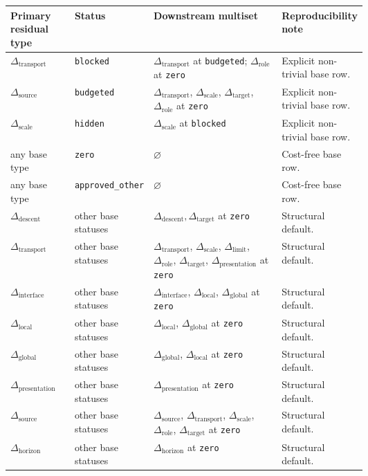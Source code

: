 \documentclass[11pt]{article}
\newcommand{\Ddescent}{\Delta_{\mathrm{descent}}}
\newcommand{\Dtransport}{\Delta_{\mathrm{transport}}}
\newcommand{\Dinterface}{\Delta_{\mathrm{interface}}}
\newcommand{\Dlocal}{\Delta_{\mathrm{local}}}
\newcommand{\Dglobal}{\Delta_{\mathrm{global}}}
\newcommand{\Dpresentation}{\Delta_{\mathrm{presentation}}}
\newcommand{\Dsource}{\Delta_{\mathrm{source}}}
\newcommand{\Dhorizon}{\Delta_{\mathrm{horizon}}}
\newcommand{\Dscale}{\Delta_{\mathrm{scale}}}
\newcommand{\Dlimit}{\Delta_{\mathrm{limit}}}
\newcommand{\Drole}{\Delta_{\mathrm{role}}}
\newcommand{\Dtarget}{\Delta_{\mathrm{target}}}
\theoremstyle{definition}
\begin{document}
\begin{table}[!ht]
  \centering
  \scriptsize
  \setlength{\tabcolsep}{3pt}
  \renewcommand{\arraystretch}{1.06}
  \begin{tabularx}{\linewidth}{>{\raggedright\arraybackslash}p{0.18\linewidth} >{\raggedright\arraybackslash}p{0.18\linewidth} >{\raggedright\arraybackslash}X >{\raggedright\arraybackslash}p{0.24\linewidth}}
    \toprule
    Primary residual type & Status & Downstream multiset & Reproducibility note \\
    \midrule
    \(\Dtransport\) & \texttt{blocked} & \(\Dtransport\) at \texttt{budgeted}; \(\Drole\) at \texttt{zero} & Explicit non-trivial base row. \\
    \(\Dsource\) & \texttt{budgeted} & \(\Dtransport\), \(\Dscale\), \(\Dtarget\), \(\Drole\) at \texttt{zero} & Explicit non-trivial base row. \\
    \(\Dscale\) & \texttt{hidden} & \(\Dscale\) at \texttt{blocked} & Explicit non-trivial base row. \\
    any base type & \texttt{zero} & \(\varnothing\) & Cost-free base row. \\
    any base type & \texttt{approved\_other} & \(\varnothing\) & Cost-free base row. \\
    \(\Ddescent\) & other base statuses & \(\Ddescent,\Dtarget\) at \texttt{zero} & Structural default. \\
    \(\Dtransport\) & other base statuses & \(\Dtransport\), \(\Dscale\), \(\Dlimit\), \(\Drole\), \(\Dtarget\), \(\Dpresentation\) at \texttt{zero} & Structural default. \\
    \(\Dinterface\) & other base statuses & \(\Dinterface\), \(\Dlocal\), \(\Dglobal\) at \texttt{zero} & Structural default. \\
    \(\Dlocal\) & other base statuses & \(\Dlocal\), \(\Dglobal\) at \texttt{zero} & Structural default. \\
    \(\Dglobal\) & other base statuses & \(\Dglobal\), \(\Dlocal\) at \texttt{zero} & Structural default. \\
    \(\Dpresentation\) & other base statuses & \(\Dpresentation\) at \texttt{zero} & Structural default. \\
    \(\Dsource\) & other base statuses & \(\Dsource\), \(\Dtransport\), \(\Dscale\), \(\Drole\), \(\Dtarget\) at \texttt{zero} & Structural default. \\
    \(\Dhorizon\) & other base statuses & \(\Dhorizon\) at \texttt{zero} & Structural default. \\

\end{tabularx}
\end{table}
\end{document}
